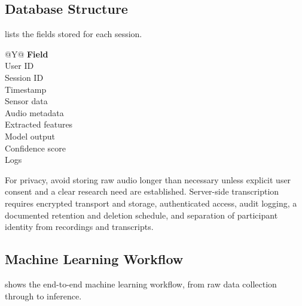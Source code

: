 \subsection{Database Structure}
\label{sec:database-structure}

 lists the fields stored for each session.

\begin{table}[H]
\centering
\caption{Fields stored per session.}
\label{tab:database-structure}
\small
\begin{tabularx}{\columnwidth}{@{}Y@{}}
\toprule
\textbf{Field} \\
\midrule
User ID \\
Session ID \\
Timestamp \\
Sensor data \\
Audio metadata \\
Extracted features \\
Model output \\
Confidence score \\
Logs \\
\bottomrule
\end{tabularx}
\end{table}

\begin{warningbox}
For privacy, avoid storing raw audio longer than necessary unless explicit user consent and a clear research need are established. Server-side transcription requires encrypted transport and storage, authenticated access, audit logging, a documented retention and deletion schedule, and separation of participant identity from recordings and transcripts.
\end{warningbox}

\subsection{Machine Learning Workflow}
\label{sec:ml-workflow}

 shows the end-to-end machine learning workflow, from raw data collection through to inference.

